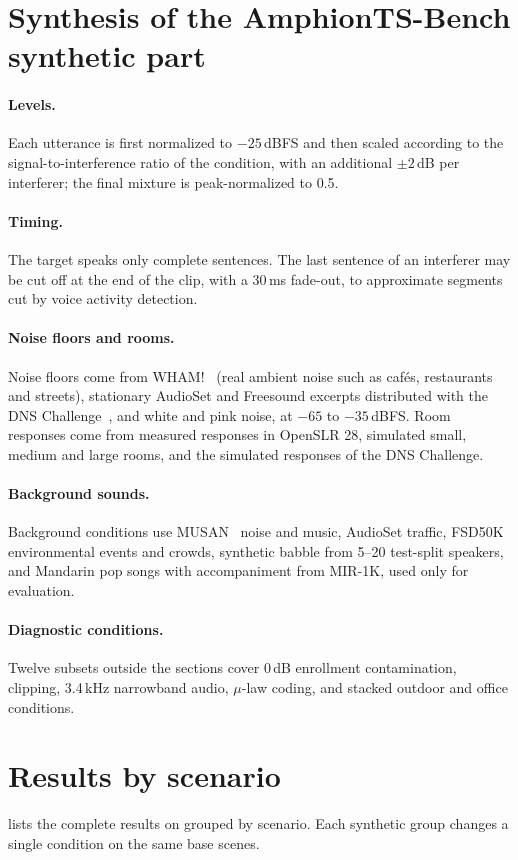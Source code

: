 
\section{Synthesis of the AmphionTS-Bench synthetic part}
\label{app:synthesis}

\paragraph{Levels.}
Each utterance is first normalized to $-25$\,dBFS and then scaled according to the signal-to-interference ratio of the condition, with an additional $\pm2$\,dB per interferer; the final mixture is peak-normalized to 0.5.

\paragraph{Timing.}
The target speaks only complete sentences.
The last sentence of an interferer may be cut off at the end of the clip, with a 30\,ms fade-out, to approximate segments cut by voice activity detection.

\paragraph{Noise floors and rooms.}
Noise floors come from WHAM!~\cite{wichern2019wham} (real ambient noise such as cafés, restaurants and streets), stationary AudioSet and Freesound excerpts distributed with the DNS Challenge~\cite{dubey2023icassp}, and white and pink noise, at $-65$ to $-35$\,dBFS.
Room responses come from measured responses in OpenSLR 28, simulated small, medium and large rooms, and the simulated responses of the DNS Challenge.

\paragraph{Background sounds.}
Background conditions use MUSAN~\cite{snyder2015musan} noise and music, AudioSet traffic, FSD50K~\cite{fonseca2022fsd50k} environmental events and crowds, synthetic babble from 5--20 test-split speakers, and Mandarin pop songs with accompaniment from MIR-1K, used only for evaluation.

\paragraph{Diagnostic conditions.}
Twelve subsets outside the sections cover 0\,dB enrollment contamination, clipping, 3.4\,kHz narrowband audio, $\mu$-law coding, and stacked outdoor and office conditions.

\section{Results by scenario}
\label{app:scenarios}

 lists the complete results on \tsbench grouped by scenario.
Each synthetic group changes a single condition on the same base scenes.

{\small

}
